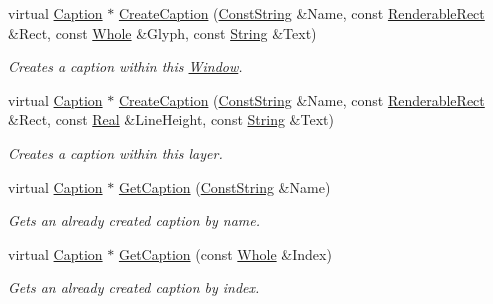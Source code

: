 \begin{DoxyCompactItemize}
virtual \hyperlink{classphys_1_1UI_1_1Caption}{Caption} $\ast$ \hyperlink{classphys_1_1UI_1_1Window_a0116b152891c33e91e6385cf6a2df40c}{CreateCaption} (\hyperlink{namespacephys_a5ce5049f8b4bf88d6413c47b504ebb31}{ConstString} \&Name, const \hyperlink{structphys_1_1UI_1_1RenderableRect}{RenderableRect} \&Rect, const \hyperlink{namespacephys_a460f6bc24c8dd347b05e0366ae34f34a}{Whole} \&Glyph, const \hyperlink{namespacephys_aa03900411993de7fbfec4789bc1d392e}{String} \&Text)
\begin{DoxyCompactList}\small\item\em Creates a caption within this \hyperlink{classphys_1_1UI_1_1Window}{Window}. \item\end{DoxyCompactList}\item 
virtual \hyperlink{classphys_1_1UI_1_1Caption}{Caption} $\ast$ \hyperlink{classphys_1_1UI_1_1Window_a2a461f25fe555f8f249697f0afdd983c}{CreateCaption} (\hyperlink{namespacephys_a5ce5049f8b4bf88d6413c47b504ebb31}{ConstString} \&Name, const \hyperlink{structphys_1_1UI_1_1RenderableRect}{RenderableRect} \&Rect, const \hyperlink{namespacephys_af7eb897198d265b8e868f45240230d5f}{Real} \&LineHeight, const \hyperlink{namespacephys_aa03900411993de7fbfec4789bc1d392e}{String} \&Text)
\begin{DoxyCompactList}\small\item\em Creates a caption within this layer. \item\end{DoxyCompactList}\item 
virtual \hyperlink{classphys_1_1UI_1_1Caption}{Caption} $\ast$ \hyperlink{classphys_1_1UI_1_1Window_acfc2669ecac2824bfa7cc53eb724d191}{GetCaption} (\hyperlink{namespacephys_a5ce5049f8b4bf88d6413c47b504ebb31}{ConstString} \&Name)
\begin{DoxyCompactList}\small\item\em Gets an already created caption by name. \item\end{DoxyCompactList}\item 
virtual \hyperlink{classphys_1_1UI_1_1Caption}{Caption} $\ast$ \hyperlink{classphys_1_1UI_1_1Window_a658864b36968fce9ab09f3d5cb14b21a}{GetCaption} (const \hyperlink{namespacephys_a460f6bc24c8dd347b05e0366ae34f34a}{Whole} \&Index)
\begin{DoxyCompactList}\small\item\em Gets an already created caption by index. \item\end{DoxyCompactList}\item 

\end{DoxyCompactItemize}
